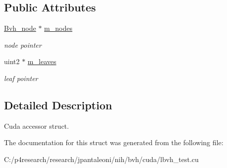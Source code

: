 \subsection*{\-Public \-Attributes}
\begin{DoxyCompactItemize}
\item 
\hypertarget{structnih_1_1_l_b_v_h__context_1_1_context_af88ebefc426d8091a059912ffe67178f}{
\hyperlink{structnih_1_1_bvh__node}{\-Bvh\-\_\-node} $\ast$ \hyperlink{structnih_1_1_l_b_v_h__context_1_1_context_af88ebefc426d8091a059912ffe67178f}{m\-\_\-nodes}}
\label{structnih_1_1_l_b_v_h__context_1_1_context_af88ebefc426d8091a059912ffe67178f}

\begin{DoxyCompactList}\small\item\em node pointer \end{DoxyCompactList}\item 
\hypertarget{structnih_1_1_l_b_v_h__context_1_1_context_ae97acea5ec92da5d4a547bc8416fef5e}{
uint2 $\ast$ \hyperlink{structnih_1_1_l_b_v_h__context_1_1_context_ae97acea5ec92da5d4a547bc8416fef5e}{m\-\_\-leaves}}
\label{structnih_1_1_l_b_v_h__context_1_1_context_ae97acea5ec92da5d4a547bc8416fef5e}

\begin{DoxyCompactList}\small\item\em leaf pointer \end{DoxyCompactList}\end{DoxyCompactItemize}


\subsection{\-Detailed \-Description}
\-Cuda accessor struct. 

\-The documentation for this struct was generated from the following file\-:\begin{DoxyCompactItemize}
\item 
\-C\-:/p4research/research/jpantaleoni/nih/bvh/cuda/lbvh\-\_\-test.\-cu\end{DoxyCompactItemize}
